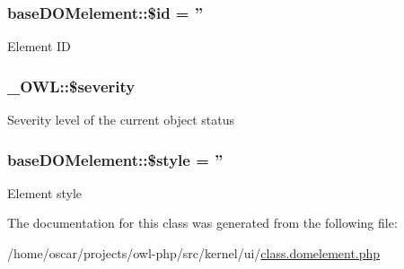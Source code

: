 \subsubsection[{\$id}]{\setlength{\rightskip}{0pt plus 5cm}baseDOMelement::\$id = ''}\label{classbaseDOMelement_adee6a7dc22e62d1348140cd8b0c38c5a}
Element ID 
\subsubsection[{\$severity}]{\setlength{\rightskip}{0pt plus 5cm}\_\-OWL::\$severity}\label{class__OWL_ad26b40a9dbbacb33e299b17826f8327c}
Severity level of the current object status 
\subsubsection[{\$style}]{\setlength{\rightskip}{0pt plus 5cm}baseDOMelement::\$style = ''}\label{classbaseDOMelement_ac2251fd920ba526872d1611d9bfbcfe0}
Element style 

The documentation for this class was generated from the following file:\begin{DoxyCompactItemize}
\item 
/home/oscar/projects/owl-\/php/src/kernel/ui/\hyperlink{class_8domelement_8php}{class.domelement.php}\end{DoxyCompactItemize}
